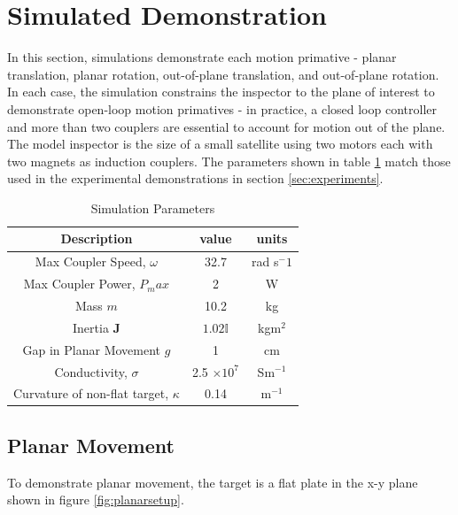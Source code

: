 \documentclass[letterpaper, 10 pt, conference]{ieeeconf}  %
\begin{document}
\section{Simulated Demonstration}\label{sec:simulations}

In this section, simulations demonstrate each motion primative - planar translation, planar rotation, out-of-plane translation, and out-of-plane rotation. In each case, the simulation constrains the inspector to the plane of interest to demonstrate open-loop motion primatives - in practice, a closed loop controller and more than two couplers are essential to account for motion out of the plane. The model inspector is the size of a small satellite using two motors each with two magnets as induction couplers. The parameters shown in table \ref{table: sim_params} match those used in the experimental demonstrations in section \ref{sec:experiments}.   

\begin{table}[h]
\caption{Simulation Parameters}
\label{table: sim_params}
\begin{center}
\begin{tabular}{| c | c | c |}
\hline
Description & value & units \\
\hline \hline
Max Coupler Speed, $\omega$ & 32.7 & rad s$^-1$ \\ \hline 
Max Coupler Power, $P_max$ & 2 & W \\ \hline

Mass $m$ & 10.2 & kg \\ \hline

Inertia $\textbf{J}$ & $1.02 \mathbb{I}$ & kgm$^2$ \\ \hline

Gap in Planar Movement $g$ & 1 & cm \\ \hline

Conductivity, $\sigma$ & 2.5 $\times 10^7$ & Sm$^{-1}$ \\ \hline

Curvature of non-flat target, $\kappa$  & 0.14 & m$^{-1}$\\

\hline
\end{tabular}
\end{center}
\end{table}

\subsection{Planar Movement}\label{sec:planar_movement_sim}
To demonstrate planar movement, the target is a flat plate in the x-y plane shown in figure \ref{fig:planarsetup}. 
  
\end{document}

